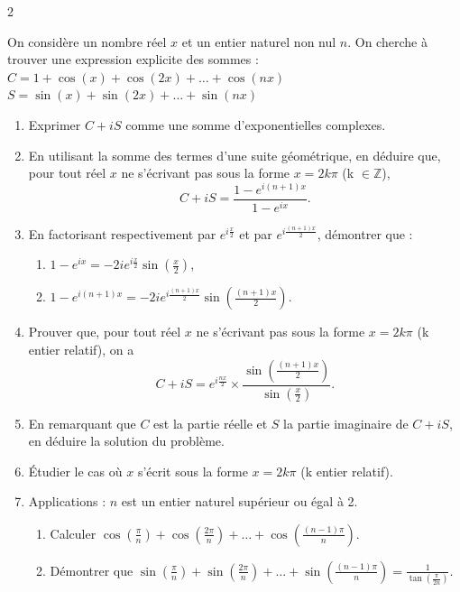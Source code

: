 \documentclass[a4paper,12pt]{article}
\begin{document}
\begin{multicols}{2}
\begin{exercice}[title=Exercice 26 \quad$\star\star\star$\quad\ ]{}{}
On considère un nombre réel \( x \) et un entier naturel non nul \( n \). On cherche à trouver une expression explicite des sommes :  
\( C = 1 + \cos(x) + \cos(2x) + \dots + \cos(nx) \)  
\( S = \sin(x) + \sin(2x) + \dots + \sin(nx) \)  

\begin{enumerate}
    \item Exprimer \( C + iS \) comme une somme d'exponentielles complexes.
    \item En utilisant la somme des termes d'une suite géométrique, en déduire que, pour tout réel \( x \) ne s'écrivant pas sous la forme \( x = 2k\pi \) (k $\in \mathbb{Z}$),
       \[
       C + iS = \frac{1 - e^{i(n+1)x}}{1 - e^{ix}}.
       \]
    \item En factorisant respectivement par \( e^{i\frac{x}{2}} \) et par \( e^{i\frac{(n+1)x}{2}} \), démontrer que :  
       \begin{enumerate}
           \item \( 1 - e^{ix} = -2ie^{i\frac{x}{2}} \sin\left(\frac{x}{2}\right) \),
           \item \( 1 - e^{i(n+1)x} = -2ie^{i\frac{(n+1)x}{2}} \sin\left(\frac{(n+1)x}{2}\right) \).
       \end{enumerate}
    \item Prouver que, pour tout réel \( x \) ne s'écrivant pas sous la forme \( x = 2k\pi \) (k entier relatif), on a
       \[
       C + iS = e^{i\frac{nx}{2}} \times \frac{\sin\left(\frac{(n+1)x}{2}\right)}{\sin\left(\frac{x}{2}\right)}.
       \]
    \item En remarquant que \( C \) est la partie réelle et \( S \) la partie imaginaire de \( C + iS \), en déduire la solution du problème.
    \item Étudier le cas où \( x \) s'écrit sous la forme \( x = 2k\pi \) (k entier relatif).
    \item Applications : \( n \) est un entier naturel supérieur ou égal à 2.
       \begin{enumerate}
           \item Calculer \( \cos\left(\frac{\pi}{n}\right) + \cos\left(\frac{2\pi}{n}\right) + \dots + \cos\left(\frac{(n-1)\pi}{n}\right) \).
           \item Démontrer que
           \(
             \sin\left(\frac{\pi}{n}\right) + \sin\left(\frac{2\pi}{n}\right) + \dots + \sin\left(\frac{(n-1)\pi}{n}\right) = \frac{1}{\tan\left(\frac{\pi}{2n}\right)}.
           \)
       \end{enumerate}
\end{enumerate}
\end{exercice}

\end{multicols}
\end{document}
